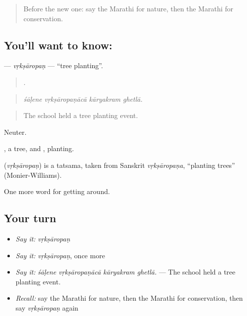 \label{lesson:MR-C449-vrksaropan}



\begin{quote}
Before the new one: say the Marathi for nature, then the Marathi for conservation.
\end{quote}

\subsection*{You'll want to know: }
\textbf{} — \emph{vṛkṣāropaṇ} — \textquotedblleft{}tree planting\textquotedblright{}.

\begin{quote}
   .
\end{quote}

\begin{quote}
\emph{śāḷene vṛkṣāropaṇācā kāryakram ghetlā.}
\end{quote}

\begin{quote}
The school held a tree planting event.
\end{quote}

Neuter.

, a tree, and , planting.

\begin{cousinweb}
\textbf{} (\emph{vṛkṣāropaṇ}) is a tatsama, taken from Sanskrit \emph{vṛkṣāropaṇa}, \textquotedblleft{}planting trees\textquotedblright{} (Monier-Williams).
\end{cousinweb}

\begin{grammarlens}[title={What you've built}]
One more word for getting around.
\end{grammarlens}

\subsection*{Your turn}
\begin{itemize}
\raggedright
  \item \emph{Say it:} \emph{vṛkṣāropaṇ}
  \item \emph{Say it:} \emph{vṛkṣāropaṇ}, once more
  \item \emph{Say it:} \emph{śāḷene vṛkṣāropaṇācā kāryakram ghetlā.} — The school held a tree planting event.
  \item \emph{Recall:} say the Marathi for nature, then the Marathi for conservation, then say \emph{vṛkṣāropaṇ} again
\end{itemize}

